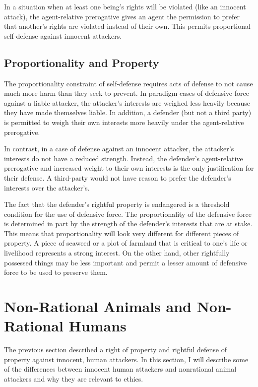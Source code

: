 	In a situation when at least one being’s rights will be violated (like an
	innocent attack), the agent-relative prerogative gives an agent the
	permission to prefer that another’s rights are violated instead of their
	own. This permits proportional self-defense against innocent attackers.
	
	\subsection{Proportionality and Property}

	The proportionality constraint of self-defense requires acts of defense
	to not cause much more harm than they seek to prevent. In paradigm cases
	of defensive force against a liable attacker, the attacker’s interests
	are weighed less heavily because they have made themselves liable. In
	addition, a defender (but not a third party) is permitted to weigh their
	own interests more heavily under the agent-relative prerogative.

	In contrast, in a case of defense against an innocent attacker, the
	attacker’s interests do not have a reduced strength. Instead, the defender’s
	agent-relative prerogative and increased weight to their own interests is
	the only justification for their defense. A third-party would not have
	reason to prefer the defender’s interests over the attacker’s.

	The fact that the defender’s rightful property is endangered is a threshold
	condition for the use of defensive force. The proportionality of the
	defensive force is determined in part by the strength of the defender’s
	interests that are at stake. This means that proportionality will look very
	different for different pieces of property. A piece of seaweed or a plot of
	farmland that is critical to one’s life or livelihood represents a strong
	interest. On the other hand, other rightfully possessed things may be less
	important and permit a lesser amount of defensive force to be used to
	preserve them.

\section{Non-Rational Animals and Non-Rational Humans}
 
	The previous section described a right of property and rightful defense
	of property against innocent, human attackers. In this section, I will
	describe some of the differences between innocent human attackers and
	nonrational animal attackers and why they are relevant to ethics.
    
